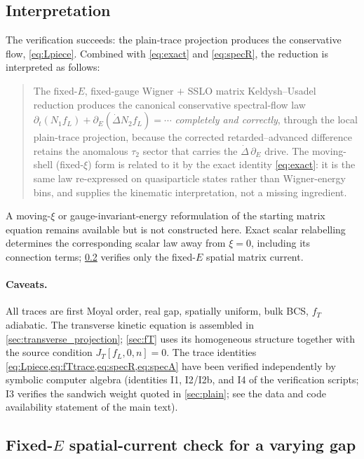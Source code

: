 \documentclass[
  aps,
  prb,
  preprint,
  superscriptaddress,
  longbibliography,
  nofootinbib
]{revtex4-2}
\newcommand{\DOS}{N_1}
\newcommand{\fL}{f_L}
\newcommand{\fT}{f_T}
\begin{document}
\subsection{Interpretation}
\label{sec:verdict}

The verification succeeds: the plain-trace projection produces the
conservative flow, \cref{eq:Lpiece}. Combined with \cref{eq:exact} and
\cref{eq:specR}, the reduction is interpreted as follows:

\begin{quote}
The fixed-$E$, fixed-gauge Wigner $+$ SSLO matrix Keldysh--Usadel reduction
produces the canonical conservative spectral-flow law
$\partial_t(\DOS\fL)+\partial_E(\dot\Delta N_2\fL)=\cdots$
\emph{completely and correctly}, through the local plain-trace projection,
because the corrected retarded--advanced difference retains the anomalous
$\tau_2$ sector that carries the $\dot\Delta\,\partial_E$ drive. The
moving-shell (fixed-$\xi$) form is related to it by the exact identity
\cref{eq:exact}: it is the same law re-expressed on quasiparticle states
rather than Wigner-energy bins, and supplies the kinematic interpretation,
not a missing ingredient.
\end{quote}

A moving-$\xi$ or gauge-invariant-energy reformulation of the starting
matrix equation remains available but is not constructed here. Exact scalar
relabelling determines the corresponding scalar law away from $\xi=0$,
including its connection terms; \cref{sec:resolution} verifies only the
fixed-$E$ spatial matrix current.

\paragraph{Caveats.} All traces are first Moyal order, real gap, spatially
uniform, bulk BCS, $\fT$ adiabatic. The transverse kinetic equation is
assembled in \cref{sec:transverse_projection}; \cref{sec:fT} uses its
homogeneous structure together with the source condition
\(J_T[\fL,0,n]=0\). The trace identities
\cref{eq:Lpiece,eq:fTtrace,eq:specR,eq:specA} have been verified independently by
symbolic computer algebra (identities I1, I2/I2b, and I4 of the
verification scripts; I3 verifies the sandwich weight quoted in
\cref{sec:plain}; see the data and code availability statement of the
main text).

\subsection{Fixed-\texorpdfstring{$E$}{E} spatial-current check for a varying gap}
\label{sec:resolution}
\end{document}
